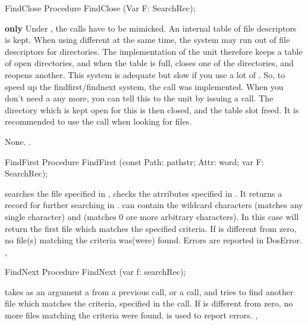 \begin{procedure}{FindClose}
\Declaration
Procedure FindClose (Var F: SearchRec);

\Description

\textbf{\linux only}
Under \linux, the  calls have to be mimicked. 
An internal table of file descriptors is kept. 
When using different  at the same time, 
the system may run out of file descriptors for directories.
The \linux implementation of the \dos unit therefore keeps a table of open
directories, and when the table is full, closes one of the directories, and
reopens another. This system is adequate but slow if you use a lot of
.
So, to speed up the findfirst/findnext system, the  call was
implemented. When you don't need a  any more, you can tell
this to the \dos unit by issuing a  call. The directory
which is kept open for this  is then closed, and the table slot
freed.
It is recommended to use the \linux call  when looking for files.

\Errors
None.
\SeeAlso
{}.
\end{procedure}
\begin{procedure}{FindFirst}
\Declaration
Procedure FindFirst (const Path: pathstr; Attr: word; var F: SearchRec);

\Description

 searches the file specified in , checks the
atrributes specified in . It returns a  record for
further searching in .
 can contain the wildcard characters  (matches any single
character) and \var{*} (matches 0 ore more arbitrary characters). In this
case  will return the first file which matches the specified
criteria.
If  is different from zero, no file(s) matching the criteria 
was(were) found.
\Errors
Errors are reported in DosError.
\SeeAlso
{},
\end{procedure}
\latex{}
\html{}
\begin{procedure}{FindNext}
\Declaration
Procedure FindNext (var f: searchRec);

\Description

 takes as an argument a  from a previous
 call, or a  call, and tries to find another
file which matches the criteria, specified in the  call.
If  is different from zero, no more files matching the
criteria were found.
\Errors
{} is used to report errors.
\SeeAlso
{}, 
\end{procedure}
